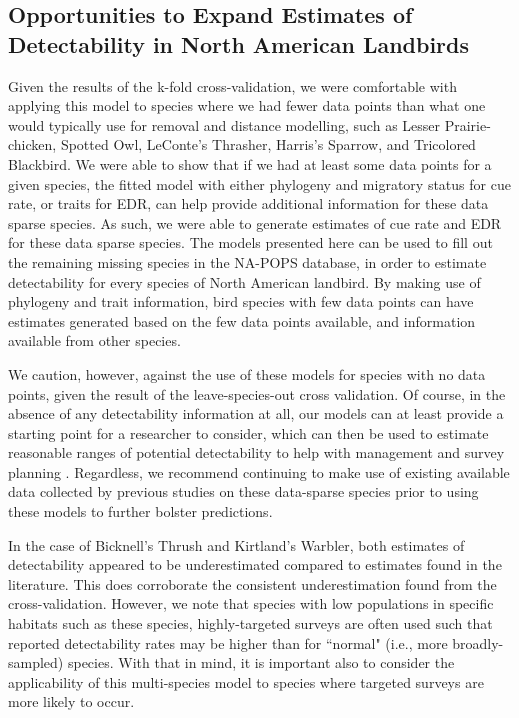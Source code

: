 \documentclass[12pt]{article}
\begin{document}
\subsection{Opportunities to Expand Estimates of Detectability in North American Landbirds}

\par Given the results of the k-fold cross-validation, we were comfortable with applying this model to species where we had fewer data points than what one would typically use for removal and distance modelling, such as Lesser Prairie-chicken, Spotted Owl, LeConte's Thrasher, Harris's Sparrow, and Tricolored Blackbird.
We were able to show that if we had at least some data points for a given species, the fitted model with either phylogeny and migratory status for cue rate, or traits for EDR, can help provide additional information for these data sparse species.
As such, we were able to generate estimates of cue rate and EDR for these data sparse species.
The models presented here can be used to fill out the remaining missing species in the NA-POPS database, in order to estimate detectability for every species of North American landbird. 
By making use of phylogeny and trait information, bird species with few data points can have estimates generated based on the few data points available, and information available from other species.

\par We caution, however, against the use of these models for species with no data points, given the result of the leave-species-out cross validation.
Of course, in the absence of any detectability information at all, our models can at least provide a starting point for a researcher to consider, which can then be used to estimate reasonable ranges of potential detectability to help with management and survey planning \citep{bennett_how_2024}.
Regardless, we recommend continuing to make use of existing available data collected by previous studies on these data-sparse species prior to using these models to further bolster predictions.

\par In the case of Bicknell's Thrush and Kirtland's Warbler, both estimates of detectability appeared to be underestimated compared to estimates found in the literature.
This does corroborate the consistent underestimation found from the cross-validation.
However, we note that species with low populations in specific habitats such as these species, highly-targeted surveys are often used such that reported detectability rates may be higher than for ``normal" (i.e., more broadly-sampled) species.
With that in mind, it is important also to consider the applicability of this multi-species model to species where targeted surveys are more likely to occur.
\end{document}
